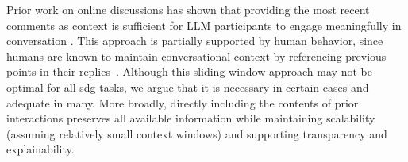 Prior work on online discussions has shown that providing the most recent comments as context is sufficient for LLM participants to engage meaningfully in conversation \cite{pavlopoulos_2020_toxicity}. This approach is partially supported by human behavior, since humans are known to maintain conversational context by referencing previous points in their replies~\cite{cannava2016repertoire, svennevig2004other,rossi2020other}. Although this sliding-window approach may not be optimal for all \ac{sdg} tasks, we argue that it is necessary in certain cases and adequate in many. More broadly, directly including the contents of prior interactions preserves all available information while maintaining scalability (assuming relatively small context windows) and supporting transparency and explainability.




